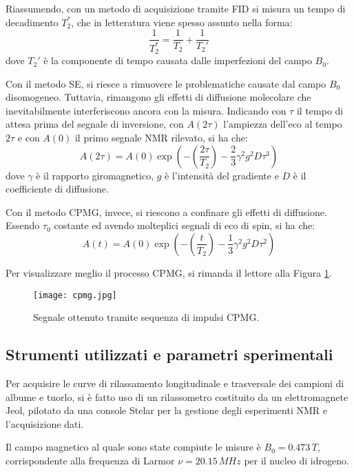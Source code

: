 Riassumendo, con un metodo di acquisizione tramite FID si misura un tempo di decadimento $T_2^*$, che in letteratura viene spesso assunto nella forma:
\begin{equation}
	\frac{1}{T_2^*} = \frac{1}{T_2} +\frac{1}{T_2'}
\end{equation}
dove $T_2'$ è la componente di tempo causata dalle imperfezioni del campo $B_0$.

Con il metodo SE, si riesce a rimuovere le problematiche causate dal campo $B_0$ disomogeneo. Tuttavia, rimangono gli effetti di diffusione molecolare che inevitabilmente interferiscono ancora con la misura. Indicando con $\tau$ il tempo di attesa prima del segnale di inversione, con $A(2\tau)$ l'ampiezza dell'eco al tempo $2\tau$ e con $A(0)$ il primo segnale NMR rilevato, si ha che:
\begin{equation}
	A(2\tau) = A(0)\exp\left(-\left(\frac{2\tau}{T_2}\right) - \frac{2}{3} \gamma^2 g^2 D \tau^3\right)
\end{equation}
dove $\gamma$ è il rapporto giromagnetico, $g$ è l'intensità del gradiente e $D$ è il coefficiente di diffusione.

Con il metodo CPMG, invece, si riescono a confinare gli effetti di diffusione. 
Essendo $\tau_0$ costante ed avendo molteplici segnali di eco di spin, si ha che:
\begin{equation}
	A(t) = A(0)\exp\left(-\left(\frac{t}{T_2}\right) - \frac{1}{3} \gamma^2 g^2 D \tau^2\right)
\end{equation}

Per visualizzare meglio il processo CPMG, si rimanda il lettore alla Figura \ref{fig:cpmg}.

\begin{figure}
\centering
\texttt{[image: cpmg.jpg]}
\caption{Segnale ottenuto tramite sequenza di impulsi CPMG. \cite{website}}
\label{fig:cpmg}
\end{figure}

\subsection*{Strumenti utilizzati e parametri sperimentali}

Per acquisire le curve di rilassamento longitudinale e trasversale dei campioni di albume e tuorlo, si è fatto uso di un rilassometro costituito da un elettromagnete Jeol, pilotato da una console Stelar per la gestione degli esperimenti NMR e l'acquisizione dati.

Il campo magnetico al quale sono state compiute le misure è $B_0 = 0.473\si{\,}{T}$, corrispondente alla frequenza di Larmor $\nu = 20.15\si{\,}{MHz}$ per il nucleo di idrogeno.

